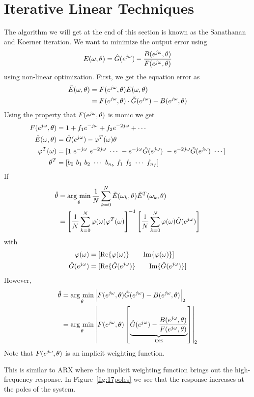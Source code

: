 \section{Iterative Linear Techniques}
The algorithm we will get at the end of this section is known as the Sanathanan and Koerner iteration.
We want to minimize the output error using
$$E(\omega,\theta) = \hat{G}(e^{j\omega}) - \frac{B(e^{j\omega},\theta)}{F(e^{j\omega},\theta)}$$
using non-linear optimization.
First, we get the equation error as
\begin{align*}
\tilde{E}(\omega,\theta) &= F(e^{j\omega},\theta)E(\omega,\theta) \\
&= F(e^{j\omega},\theta)\cdot\tilde{G}(e^{j\omega}) - B(e^{j\omega},\theta)
\end{align*}
Using the property that $F(e^{j\omega},\theta)$ is monic we get
\begin{align*}
F(e^{j\omega},\theta) &= 1 + f_1e^{-j\omega} + f_2e^{-2j\omega} + \cdots \\
\tilde{E}(\omega,\theta) &= \hat{G}(e^{j\omega}) - \varphi^T(\omega)\theta \\
\varphi^T(\omega) &= [1~e^{-j\omega}~e^{-2j\omega}~\cdots~-e^{-j\omega}\hat{G}(e^{j\omega})~-e^{-2j\omega}\hat{G}(e^{j\omega})~\cdots] \\
\theta^T &= [b_0~b_1~b_2~\cdots~b_{n_b}~f_1~f_2~\cdots~f_{n_f}]
\end{align*}
If
\begin{align*}
\hat{\theta} &= \mathop{\arg\,\min}\limits_\theta \frac{1}{N}\sum_{k=0}^N\tilde{E}(\omega_k,\theta)\tilde{E}^T(\omega_k,\theta) \\
&= {\left[\frac{1}{N}\sum_{k=0}^N\varphi(\omega)\varphi^T(\omega)\right]}^{-1}\left[\frac{1}{N}\sum_{k=0}^N\varphi(\omega)\hat{G}(e^{j\omega})\right]
\end{align*}
with
\begin{align*}
\varphi(\omega) &= [\text{Re}\{\varphi(\omega)\} \qquad \text{Im}\{\varphi(\omega)\}] \\
\hat{G}(e^{j\omega}) &= [\text{Re}\{\hat{G}(e^{j\omega})\} \qquad \text{Im}\{\hat{G}(e^{j\omega})\}]
\end{align*}
However,
\begin{align*}
\hat{\theta} &= \mathop{\arg\,\min}\limits_\theta \left|F(e^{j\omega},\theta)\hat{G}(e^{j\omega}) - B(e^{j\omega},\theta)\right|_2 \\
&= \mathop{\arg\,\min}\limits_\theta \left|F(e^{j\omega},\theta)\left[\underbrace{\hat{G}(e^{j\omega}) - \frac{B(e^{j\omega},\theta)}{F(e^{j\omega},\theta)}}_{\text{OE}}\right]\right|_2
\end{align*}
Note that $F(e^{j\omega},\theta)$ is an implicit weighting function.

This is similar to ARX where the implicit weighting function brings out the high-frequency response.
In Figure~\ref{fig:17poles} we see that the response increases at the poles of the system.


